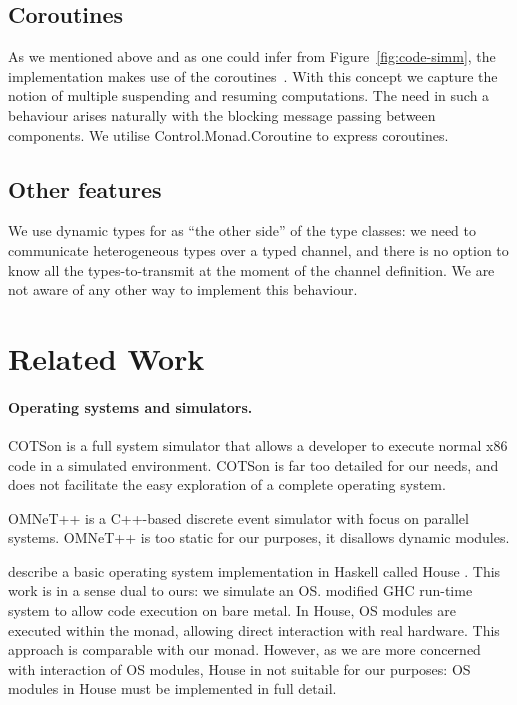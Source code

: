 \subsection{Coroutines}
\label{sec:impl-coroutines}
As we mentioned above and as one could infer from Figure~\ref{fig:code-simm}, the implementation makes use of the coroutines~\cite{coroutines}.
With this concept we capture the notion of multiple suspending and resuming computations.
The need in such a behaviour arises naturally with the blocking message passing between components.
We utilise \textsf{Control.Monad.Coroutine} \cite{cmt} to express coroutines.

\subsection{Other features}
We use dynamic types \cite{Abadi:1991:DTS:103135.103138} for as ``the other side'' of the type classes: we need to communicate heterogeneous types over a typed channel, and there is no option to know all the types-to-transmit at the moment of the channel definition.
We are not aware of any other way to implement this behaviour.

\section{Related Work}
\label{sec:related-work}

\paragraph{Operating systems and simulators.}
COTSon \cite{cotson} is a full system simulator that allows a developer to execute normal x86 code in a simulated environment.
COTSon is far too detailed for our needs, and does not facilitate the easy exploration of a complete operating system.

OMNeT++ \cite{omnet} is a C++-based discrete event simulator with focus on parallel systems. OMNeT++ is too static for our purposes, it disallows dynamic modules.


\citeauthor{house} describe a basic operating system implementation in Haskell called House \cite{house}.
This work is in a sense dual to ours: we simulate an OS.
\citeauthor{house} modified GHC run-time system to allow code execution on bare metal.
In House, OS modules are executed within the  monad, allowing direct interaction with real hardware.
This approach is comparable with our  monad.
However, as we are more concerned with interaction of OS modules, House in not suitable for our purposes:  OS modules in House must be implemented in full detail.

